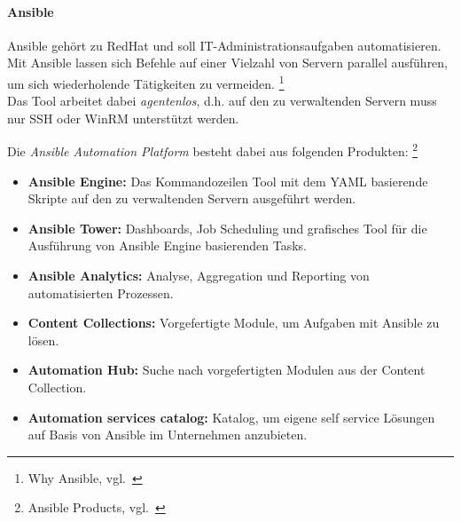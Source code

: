 \paragraph{Ansible}\label{iac_tools_tools_ansible}

Ansible gehört zu RedHat und soll IT-Administrationsaufgaben automatisieren.
Mit Ansible lassen sich Befehle auf einer Vielzahl von Servern parallel ausführen, um sich wiederholende Tätigkeiten zu vermeiden.
\footnote{{Why Ansible, vgl.~\cite{ANSIBLE_OVERVIEW}}} \\

Das Tool arbeitet dabei \textsl{agentenlos}, d.h. auf den zu verwaltenden Servern muss nur SSH oder WinRM unterstützt werden.

Die \textsl{Ansible Automation Platform} besteht dabei aus folgenden Produkten:
\footnote{{Ansible Products, vgl.~\cite{ANSIBLE_PRODUCTS}}}

\begin{itemize}
    \item \textbf{Ansible Engine:}
    Das Kommandozeilen Tool mit dem YAML basierende Skripte auf den zu verwaltenden Servern ausgeführt werden.

    \item \textbf{Ansible Tower:}
    Dashboards, Job Scheduling und grafisches Tool für die Ausführung von Ansible Engine basierenden Tasks.

    \item \textbf{Ansible Analytics:}
    Analyse, Aggregation und Reporting von automatisierten Prozessen.

    \item \textbf{Content Collections:}
    Vorgefertigte Module, um Aufgaben mit Ansible zu lösen.

    \item \textbf{Automation Hub:}
    Suche nach vorgefertigten Modulen aus der Content Collection.

    \item \textbf{Automation services catalog:}
    Katalog, um eigene self service Lösungen auf Basis von Ansible im Unternehmen anzubieten.
\end{itemize}
